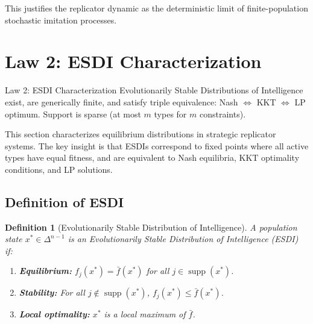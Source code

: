 \documentclass[12pt]{article}
\newtheorem{definition}[theorem]{Definition}
\DeclareMathOperator{\supp}{supp}
\begin{document}
This justifies the replicator dynamic as the deterministic limit of finite-population stochastic imitation processes.




\section{Law 2: ESDI Characterization}
\label{sec:law2}

\begin{lawbox}{Law 2: ESDI Characterization}
Evolutionarily Stable Distributions of Intelligence exist, are generically finite, and satisfy triple equivalence: Nash $\Leftrightarrow$ KKT $\Leftrightarrow$ LP optimum. Support is sparse (at most $m$ types for $m$ constraints).
\end{lawbox}

This section characterizes equilibrium distributions in strategic replicator systems. The key insight is that ESDIs correspond to fixed points where all active types have equal fitness, and are equivalent to Nash equilibria, KKT optimality conditions, and LP solutions.

\subsection{Definition of ESDI}

\begin{definition}[Evolutionarily Stable Distribution of Intelligence]
\label{def:esdi}
A population state $x^* \in \Delta^{n-1}$ is an \emph{Evolutionarily Stable Distribution of Intelligence (ESDI)} if:
\begin{enumerate}
    \item \textbf{Equilibrium:} $f_j(x^*) = \bar{f}(x^*)$ for all $j \in \supp(x^*)$.
    \item \textbf{Stability:} For all $j \notin \supp(x^*)$, $f_j(x^*) \leq \bar{f}(x^*)$.
    \item \textbf{Local optimality:} $x^*$ is a local maximum of $\bar{f}$.
\end{enumerate}
\end{definition}
\end{document}
